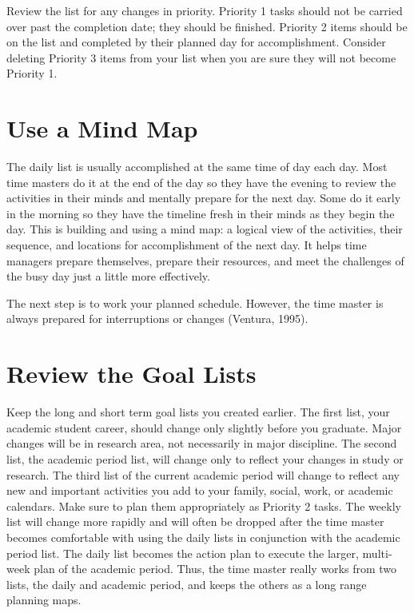 \documentclass[twocolumn]{article}
\begin{document}
Review the list for any changes in priority. Priority 1 tasks should not be
carried over past the completion date; they should be finished. Priority 2 items
should be on the list and completed by their planned day for accomplishment.
Consider deleting Priority 3 items from your list when you are sure they will not
become Priority 1.

\section*{Use a Mind Map}
\noindent
The daily list is usually accomplished at the same time of day each day.
Most time masters do it at the end of the day so they have the evening to review
the activities in their minds and mentally prepare for the next day. Some do it
early in the morning so they have the timeline fresh in their minds as they
begin the day. This is building and using a mind map: a logical view of the
activities, their sequence, and locations for accomplishment of the next day. It
helps time managers prepare themselves, prepare their resources, and meet the
challenges of the busy day just a little more effectively.

The next step is to work your planned schedule. However, the time master is
always prepared for interruptions or changes (Ventura, 1995).

\section*{Review the Goal Lists}
\noindent
Keep the long and short term goal lists you created earlier. The first list,
your academic student career, should change only slightly before you graduate.
Major changes will be in research area, not necessarily in major discipline. The
second list, the academic period list, will change only to reflect your changes
in study or research. The third list of the current academic period will change
to reflect any new and important activities you add to your family, social, work,
or academic calendars. Make sure to plan them appropriately as Priority 2 tasks.
The weekly list will change more rapidly and will often be dropped after the
time master becomes comfortable with using the daily lists in conjunction with
the academic period list. The daily list becomes the action plan to execute the
larger, multi-week plan of the academic period. Thus, the time master really
works from two lists, the daily and academic period, and keeps the others as a
long range planning maps.
\end{document}
